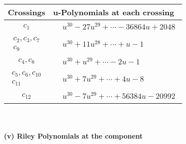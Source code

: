 \documentclass[1p]{elsarticle_modified}
\theoremstyle{definition}
\begin{document}
\begin{tabular}{m{50pt}|m{274pt}}
Crossings & \hspace{64pt}u-Polynomials at each crossing \\
\hline $$\begin{aligned}c_{1}\end{aligned}$$&$\begin{aligned}
&u^{30}-27 u^{29}+\cdots-36864 u+2048
\end{aligned}$\\
\hline $$\begin{aligned}c_{2},c_{3},c_{7}\\c_{9}\end{aligned}$$&$\begin{aligned}
&u^{30}+11 u^{28}+\cdots+u-1
\end{aligned}$\\
\hline $$\begin{aligned}c_{4},c_{8}\end{aligned}$$&$\begin{aligned}
&u^{30}+u^{29}+\cdots-2 u-1
\end{aligned}$\\
\hline $$\begin{aligned}c_{5},c_{6},c_{10}\\c_{11}\end{aligned}$$&$\begin{aligned}
&u^{30}+7 u^{29}+\cdots+4 u-8
\end{aligned}$\\
\hline $$\begin{aligned}c_{12}\end{aligned}$$&$\begin{aligned}
&u^{30}-7 u^{29}+\cdots+56384 u-20992
\end{aligned}$\\
\hline
\end{tabular}\\~\\
\newpage\renewcommand{\arraystretch}{1}
\flushleft \textbf{(v) Riley Polynomials at the component}\newline \\
\end{document}
